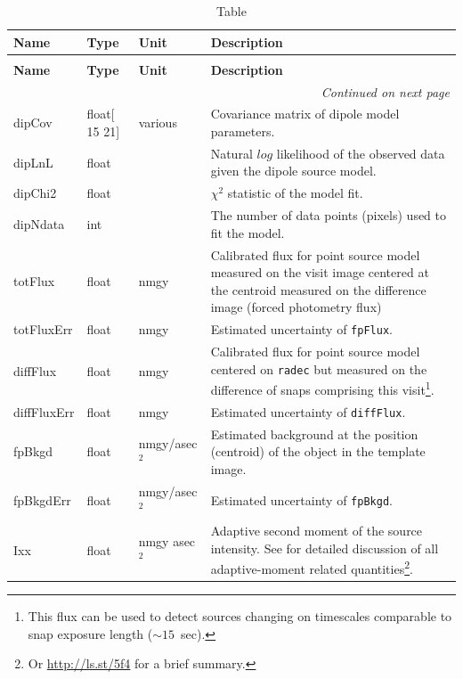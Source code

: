\documentclass[SE,lsstdraft,toc]{lsstdoc}
\newcommand{\oldtext}[1]{{\color{red} #1}}
\newcommand{\newtext}[1]{{\color{blue} #1}}
\newenvironment{schema}[3]{%
\setlength\LTleft{0pt}
\setlength\LTright{\fill}
\begin{longtable}{p{0.2\textwidth}p{0.14\textwidth}p{0.14\textwidth}p{0.41\textwidth}}

\caption[#1]{#2\label{#3}}\\

\hline \textbf{Name} & \textbf{Type} & \textbf{Unit} & \textbf{Description}\\ \hline
\endfirsthead

\caption[#1]{#2}\\

\hline \textbf{Name} & \textbf{Type} & \textbf{Unit} & \textbf{Description}\\ \hline
\endhead

\hline \multicolumn{4}{r}{\emph{Continued on next page}} \\
\endfoot

\hline\hline
\endlastfoot
}{%
\hline
\end{longtable}
}
\begin{document}
\begin{schema}{\DIASource Table}{\DIASource Table}{tbl:diasourceTable}
dipCov & float[\oldtext{15}\newtext{21}] & various & Covariance matrix of dipole model parameters. \\

dipLnL & float & ~ & Natural $log$ likelihood of the observed data given the dipole source model. \\

dipChi2 & float & ~ & $\chi^2$ statistic of the model fit. \\

dipNdata & int & ~ & The number of data points (pixels) used to fit the model. \\

totFlux & float & nmgy & Calibrated flux for point source model measured on the visit image centered at the centroid measured on the difference image (forced photometry flux) \\

totFluxErr & float & nmgy & Estimated uncertainty of \texttt{fpFlux}. \\

diffFlux & float & nmgy & Calibrated flux for point source model centered on \texttt{radec} but measured on the difference of snaps comprising this visit\footnote{This flux can be used to detect sources changing on timescales comparable to snap exposure length ($\sim 15$~sec).}. \\

diffFluxErr & float & nmgy & Estimated uncertainty of \texttt{diffFlux}. \\

fpBkgd & float & nmgy/asec$^{2}$ & Estimated background at the position (centroid) of the object in
the template image. \\

fpBkgdErr & float & nmgy/asec$^{2}$ & Estimated uncertainty of \texttt{fpBkgd}. \\



Ixx & float & \oldtext{nmgy} asec$^{2}$  & Adaptive second moment of the source intensity. See \citet{2002AJ....123..583B} for detailed discussion of all adaptive-moment related quantities\footnote{Or \url{http://ls.st/5f4} for a brief summary.}. \\


\end{schema}
\end{document}
